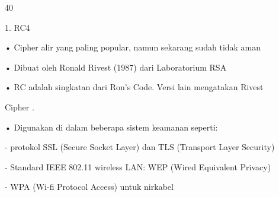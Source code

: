 \documentclass{article}
\begin{document}

40

1. RC4

• Cipher alir yang paling popular, namun sekarang sudah tidak aman

• Dibuat oleh Ronald Rivest (1987) dari Laboratorium RSA

• RC adalah singkatan dari Ron’s Code. Versi lain mengatakan Rivest 

Cipher .

• Digunakan di dalam beberapa sistem keamanan seperti:

 - protokol SSL (Secure Socket Layer) dan TLS (Transport Layer Security) 

 - Standard IEEE 802.11 wireless LAN: WEP (Wired Equivalent Privacy)

 - WPA (Wi-fi Protocol Access) untuk nirkabel
\end{document}
